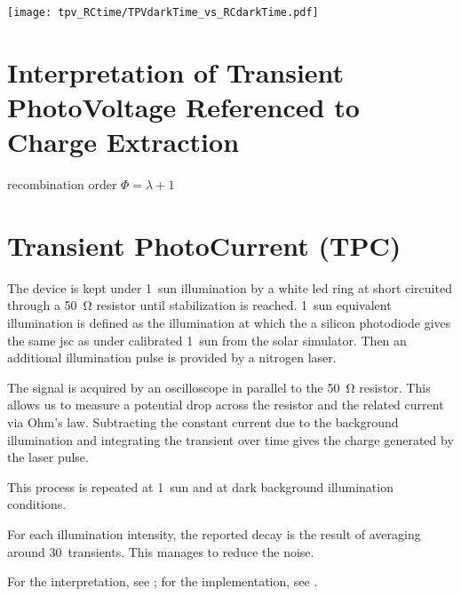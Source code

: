 \begin{SCfigure}
	\centering
	\texttt{[image: tpv\_RCtime/TPVdarkTime\_vs\_RCdarkTime.pdf]}
	\label{fig:tpv_RCtime}
\end{SCfigure}

\section{Interpretation of Transient PhotoVoltage Referenced to Charge Extraction}\label{interpretation_tpvce}

recombination order $\Phi = \lambda + 1$ \cite{Shuttle2008d,Credgington2011}



\section{Transient PhotoCurrent (TPC)}
\cite{ORegan2004}
	The device is kept under 1~sun illumination by a white \gls{led} ring at short circuited through a \SI{50}{\ohm} resistor until stabilization is reached. 1~sun equivalent illumination is defined as the illumination at which the a silicon photodiode gives the same \gls{jsc} as under calibrated 1~sun from the solar simulator. Then an additional illumination pulse is provided by a nitrogen laser.

	The signal is acquired by an oscilloscope in parallel to the \SI{50}{\ohm} resistor. This allows us to measure a potential drop across the resistor and the related current via Ohm's law. Subtracting the constant current due to the background illumination and integrating the transient over time gives the charge generated by the laser pulse.

	This process is repeated at 1~sun and at dark background illumination conditions.

	For each illumination intensity, the reported decay is the result of averaging around 30~transients. This manages to reduce the noise.

	For the interpretation, see ; for the implementation, see .

